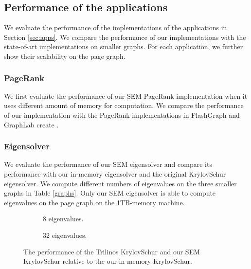 \subsection{Performance of the applications}

We evaluate the performance of the implementations of the applications in
Section \ref{sec:apps}. We compare the performance of our implementations
with the state-of-art implementations on smaller graphs. For each application,
we further show their scalability on the page graph.

\subsubsection{PageRank}
We first evaluate the performance of our SEM PageRank implementation when
it uses different amount of memory for computation. We compare the performance
of our implementation with the PageRank implementations in FlashGraph
\cite{flashgraph} and GraphLab create \cite{}.

\subsubsection{Eigensolver}

We evaluate the performance of our SEM eigensolver and compare its performance
with our in-memory eigensolver and the original KrylovSchur eigensolver.
We compute different numbers of eigenvalues on the three smaller graphs in
Table \ref{graphs}. Only our SEM eigensolver is able to compute eigenvalues
on the page graph on the 1TB-memory machine.

\begin{figure}[t]
\centering
\footnotesize
\begin{subfigure}{.5\linewidth}
	
	\caption{8 eigenvalues.}
	\label{fig:eigen8}
\end{subfigure}%
\begin{subfigure}{.5\linewidth}
	
	\caption{32 eigenvalues.}
	\label{fig:eigen32}
\end{subfigure}
\caption{The performance of the Trilinos KrylovSchur and our SEM KrylovSchur
relative to the our in-memory KrylovSchur.}
\label{fig:eigen}
\end{figure}

